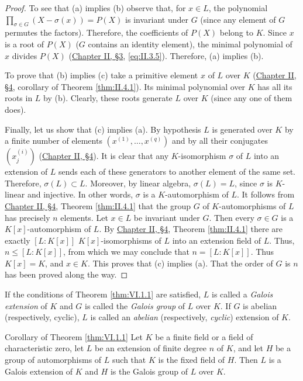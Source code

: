 \begin{proof}
To see that (a) implies (b) observe that, for $x\in L$, the polynomial
$\prod_{\sigma\in G}(X-\sigma(x))=P(X)$ is invariant under $G$ (since any
element of $G$ permutes the factors). Therefore, the coefficients of
$P(X)$ belong to $K$. Since $x$ is a root of $P(X)$ ($G$ contains an
identity element), the minimal polynomial of $x$ divides $P(X)$
(\hyperref[sec:2.3]{Chapter II, §3}, \eqref{eq:II.3.5}). Therefore, (a) implies (b).

To prove that (b) implies (c) take a primitive element $x$ of $L$ over
$K$ (\hyperref[sec:2.4]{Chapter II, §4}, corollary of Theorem \ref{thm:II.4.1}). Its minimal
polynomial over $K$ has all its roots in $L$ by (b). Clearly, these roots
generate $L$ over $K$ (since any one of them does).

Finally, let us show that (c) implies (a). By hypothesis $L$ is generated
over $K$ by a finite number of elements $(x^{(1)},\ldots,x^{(q)})$ and by
all their conjugates $(x_{j}^{(i)})$ (\hyperref[sec:2.4]{Chapter II, §4}). It is clear that any
$K$-isomorphism $\sigma$ of $L$ into an extension of $L$ sends each of
these generators to another element of the same set. Therefore,
$\sigma(L)\subset L$. Moreover, by linear algebra, $\sigma(L)=L$, since
$\sigma$ is $K$-linear and injective. In other words, $\sigma$ is a
$K$-automorphism of $L$. It follows from \hyperref[sec:2.4]{Chapter II, §4}, Theorem
\ref{thm:II.4.1} that the group $G$ of $K$-automorphisms of $L$ has
precisely $n$ elements. Let $x\in L$ be invariant under $G$. Then every
$\sigma\in G$ is a $K[x]$-automorphism of $L$. By \hyperref[sec:2.4]{Chapter II, §4}, Theorem
\ref{thm:II.4.1} there are exactly $[L:K[x]]$ $K[x]$-isomorphisms of $L$
into an extension field of $L$. Thus, $n\leq[L:K[x]]$, from which we may
conclude that $n=[L:K[x]]$. Thus $K[x]=K$, and $x\in K$. This proves that
(c) implies (a). That the order of $G$ is $n$ has been proved along the
way.
\end{proof}

\begin{definition}
\label{def:VI.1.1}
If the conditions of Theorem \ref{thm:VI.1.1} are satisfied, $L$ is called
a \emph{Galois extension} of $K$ and $G$ is called the \emph{Galois group}
of $L$ over $K$. If $G$ is abelian (respectively, cyclic), $L$ is called an
\emph{abelian} (respectively, \emph{cyclic}) extension of $K$.
\end{definition}

\begin{statement}{Corollary of Theorem \ref{thm:VI.1.1}}
Let $K$ be a finite field or a field of characteristic zero, let $L$ be an
extension of finite degree $n$ of $K$, and let $H$ be a group of
automorphisms of $L$ such that $K$ is the fixed field of $H$. Then $L$ is
a Galois extension of $K$ and $H$ is the Galois group of $L$ over $K$.
\end{statement}

